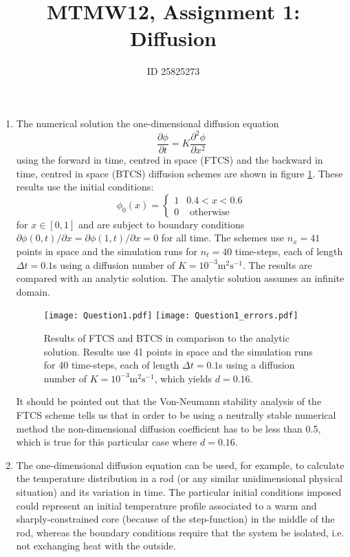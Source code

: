 \documentclass[12pt]{article}
\begin{document}
\thispagestyle{empty}

\title{MTMW12, Assignment 1: Diffusion}
\author{ID 25825273}
\maketitle


\begin{enumerate}

\item The numerical solution the one-dimensional diffusion equation
\begin{equation}
\frac{\partial\phi}{\partial t}=K\frac{\partial^{2}\phi}{\partial x^{2}}
\end{equation}
using the forward in time, centred in space (FTCS) and the backward
in time, centred in space (BTCS) diffusion schemes are shown in figure
\ref{fig:Q1}. These results use the initial conditions: 
\[
\phi_{0}(x)=\begin{cases}
1 & 0.4<x<0.6\\
0 & \text{ otherwise}
\end{cases}
\]
for $x\in[0,1]$ and are subject to boundary conditions $\partial\phi(0,t)/\partial x=\partial\phi(1,t)/\partial x=0$
for all time. The schemes use $n_{x}=41$ points in space and the
simulation runs for $n_{t}=40$ time-steps, each of length $\Delta t=0.1$s
using a diffusion number of $K=10^{-3}\text{m}^{2}\text{s}^{-1}$. The results are
compared with an analytic solution. The analytic solution assumes
an infinite domain.

\begin{figure}[!tbh]
\texttt{[image: Question1.pdf]}
\texttt{[image: Question1\_errors.pdf]}

\caption{Results of FTCS and BTCS in comparison to the analytic solution. Results
use 41 points in space and the simulation runs for 40 time-steps,
each of length $\Delta t=0.1$s using a diffusion number of $K=10^{-3}\text{m}^{2}\text{s}^{-1}$, which yields $d=0.16$.
\label{fig:Q1}}
\end{figure}

It should be pointed out that the Von-Neumann stability analysis of the FTCS scheme tells us that in order to be using a neutrally stable numerical method the non-dimensional diffusion coefficient has to be less than 0.5, which is true for this particular case where $d=0.16$.


\item The one-dimensional diffusion equation can be used, for example, to
calculate the temperature distribution in a rod (or any similar unidimensional physical situation) and its variation in time. The particular initial conditions imposed could represent an initial temperature profile associated to a warm and sharply-constrained core (because of the step-function) in the middle of the rod, whereas the boundary conditions require that the system be isolated, i.e. not exchanging heat with the outside.


\end{enumerate}
\end{document}
